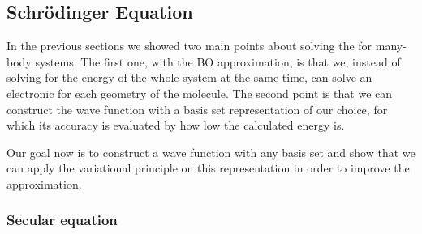 \documentclass[../master_thesis.tex]{subfiles}
\begin{document}
\subsection{Schr\"{o}dinger Equation}
In the previous sections we showed two main points about solving the \SE for
many-body systems. The first one, with the \ac{BO} approximation, is that we,
instead of solving for the energy of the whole system at the same time, can solve an electronic
\SE for each geometry of the molecule. The second point is that we can construct
the wave function with a basis set representation of our choice, for which its
accuracy is evaluated by how low the calculated energy is.

Our goal now is to construct a wave function with any basis set and show that we
can apply the variational principle on this representation in order to improve
the approximation.

\subsubsection{Secular equation}
\end{document}
